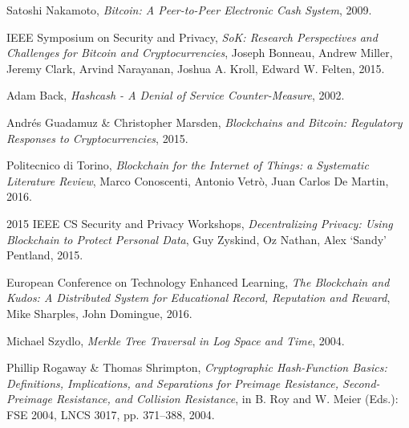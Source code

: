 %
%
%
\begin{thebibliography}{1}

  Satoshi Nakamoto,
  \emph{Bitcoin: A Peer-to-Peer Electronic Cash System},
  2009.



  IEEE Symposium on Security and Privacy,
  \emph{SoK: Research Perspectives and Challenges for Bitcoin and
Cryptocurrencies},
  Joseph Bonneau, Andrew Miller, Jeremy Clark, Arvind Narayanan, Joshua
A. Kroll, Edward W. Felten,
  2015.



  Adam Back,
  \emph{Hashcash - A Denial of Service Counter-Measure},
  2002.

  Andrés Guadamuz \& Christopher Marsden,
  \emph{Blockchains and Bitcoin: Regulatory Responses to Cryptocurrencies},
  2015.

  Politecnico di Torino,
  \emph{Blockchain for the Internet of Things: a Systematic Literature Review},
  Marco Conoscenti, Antonio Vetrò, Juan Carlos De Martin,
  2016.

  2015 IEEE CS Security and Privacy Workshops,
  \emph{Decentralizing Privacy: Using Blockchain to Protect Personal Data},
  Guy Zyskind, Oz Nathan, Alex `Sandy' Pentland,
  2015.

  European Conference on Technology Enhanced Learning,
  \emph{The Blockchain and Kudos: A Distributed System for Educational Record,
Reputation and Reward},
  Mike Sharples, John Domingue,
  2016.


  Michael Szydlo,
  \emph{Merkle Tree Traversal in Log Space and Time},
  2004.


  Phillip Rogaway \& Thomas Shrimpton,
  \emph{Cryptographic Hash-Function Basics: Definitions, Implications, and
Separations for Preimage Resistance, Second-Preimage Resistance, and Collision
Resistance},
  in B. Roy and W. Meier (Eds.): FSE 2004, LNCS 3017, pp. 371–388,
  2004.


\end{thebibliography}

